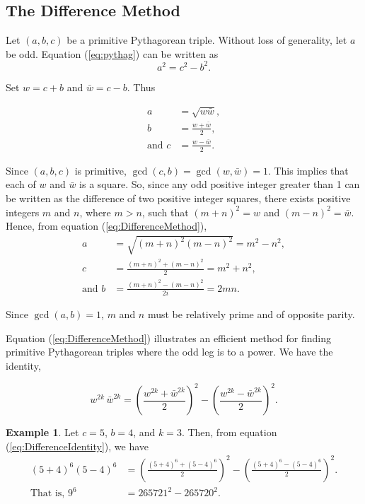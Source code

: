 \documentclass{article}
\theoremstyle{definition}
\newtheorem{example}{Example}[section]
\begin{document}
\subsection{The Difference Method}
\label{sec:PTDiff}

Let \((a,b,c)\) be a primitive Pythagorean triple. Without loss of generality, let \(a\) be odd. Equation (\ref{eq:pythag}) can be written as \[ a^2 = c^2 - b^2. \]

Set \(w = c + b\) and \(\bar{w} = c - b\). Thus

\begin{equation}
\begin{aligned}
a &= \sqrt{w \bar{w}}, \\
b &= \frac{w + \bar{w}}{2}, \\
\text{and } c &= \frac{w - \bar{w}}{2}.
\end{aligned}
\label{eq:DifferenceMethod}
\end{equation}

Since \((a,b,c)\) is primitive,  \(\gcd(c,b) = \gcd(w,\bar{w}) = 1\). This implies that each of \(w\) and \(\bar{w}\) is a square. So, since any odd positive integer greater than 1 can be written as the difference of two positive integer squares, there exists positive integers \(m\) and \(n\), where \(m > n\), such that \((m+n)^2 = w\) and \((m-n)^2 = \bar{w}\). Hence, from equation (\ref{eq:DifferenceMethod}), \[\begin{aligned} a &= \sqrt{(m+n)^2(m-n)^2} = m^2-n^2, \\ c &= \frac{(m+n)^2 + (m-n)^2}{2} = m^2+n^2, \\ \text{and } b &= \frac{(m+n)^2 - (m-n)^2}{2i} = 2mn. \end{aligned}\]

Since  \(\gcd(a,b)=1\), \(m\) and \(n\) must be relatively prime and of opposite parity.

Equation (\ref{eq:DifferenceMethod}) illustrates an efficient method for finding primitive Pythagorean triples where the odd leg is to a power. We have the identity,

\begin{equation}
w^{2k}\,\bar{w}^{2k} = \left( \frac{w^{2k} + \bar{w}^{2k}}{2} \right)^2 - \left( \frac{w^{2k} - \bar{w}^{2k}}{2} \right)^2 .
\label{eq:DifferenceIdentity}
\end{equation}

\begin{example}
Let \(c = 5\), \(b = 4\), and \(k = 3\). Then, from equation (\ref{eq:DifferenceIdentity}), we have \[ \begin{aligned} (5+4)^6 (5-4)^6 &= \left( \frac{(5+4)^6+(5-4)^6}{2} \right)^2 - \left( \frac{(5+4)^6-(5-4)^6}{2} \right)^2. \\ \text{That is, } 9^6 &= 265721^2 - 265720^2. \end{aligned} \]
\end{example}
\end{document}
